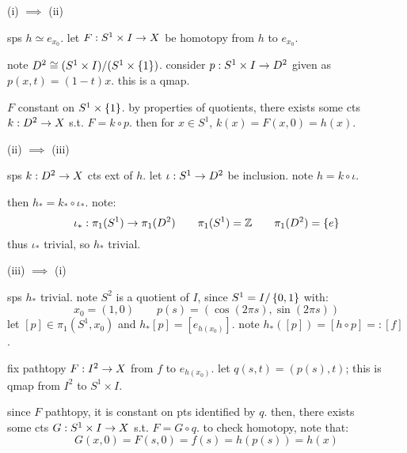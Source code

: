 \newpage
\begin{pf}[source=Primary Source Material]
    (i) $\implies$ (ii)
    \begin{block}
        sps $h\simeq e_{x_{0}}$. let $F:S^{1}\times I\rightarrow X$ be homotopy from $h$ to $e_{x_{0}}$.

        note $D^{2}\cong(S^{1}\times I)/(S^{1}\times\left\{{1}\right\})$.
        consider $p:S^{1}\times I\rightarrow D^{2}$ given as $p(x,t)=(1-t)x$.
        this is a qmap.

        $F$ constant on $S^{1}\times\left\{{1}\right\}$.
        by properties of quotients, there exists some cts $k:D^{2}\rightarrow X$ s.t. $F=k\circ p$.
        then for $x\in S^{1}$, $k(x)=F(x,0)=h(x)$.
    \end{block}

    (ii) $\implies$ (iii)
    \begin{block}
        sps $k:D^{2}\rightarrow X$ cts ext of $h$.
        let $\iota:S^{1}\rightarrow D^{2}$ be inclusion. note $h=k\circ\iota$.
        
        then $h_{*}=k_{*}\circ\iota_{*}$. note:
        \begin{equation*}
            \iota_{*}:\pi_{1}(S^{1})\rightarrow\pi_{1}(D^{2}) \qquad
            \pi_{1}(S^{1})=\mathbb{Z} \qquad \pi_{1}(D^{2})=\left\{{e}\right\}
        \end{equation*}
        thus $\iota_{*}$ trivial, so $h_{*}$ trivial.
    \end{block}

    (iii) $\implies$ (i)
    \begin{block}
        sps $h_{*}$ trivial.
        note $S^{2}$ is a quotient of $I$, since $S^{1}=I/\left\{{0,1}\right\}$ with:
        \begin{equation*}
            x_{0}=(1,0) \qquad p(s)=(\cos(2\pi s),\sin(2\pi s))
        \end{equation*}
        let $[p]\in\pi_{1}(S^{1},x_{0})$ and $h_{*}[p]=[e_{h(x_{0})}]$.
        note $h_{*}([p])=[h\circ p]=:[f]$.

        fix pathtopy $F:I^{2}\rightarrow X$ from $f$ to $e_{h(x_{0})}$.
        let $q(s,t)=(p(s),t)$; this is qmap from $I^{2}$ to $S^{1}\times I$.

        since $F$ pathtopy, it is constant on pts identified by $q$.
        then, there exists \\ %
        some cts $G:S^{1}\times I\rightarrow X$ s.t. $F=G\circ q$.
        to check homotopy, note that:
        \begin{equation*}
            G(x,0)=F(s,0)=f(s)=h(p(s))=h(x)
        \end{equation*}
    \end{block}
\end{pf}


